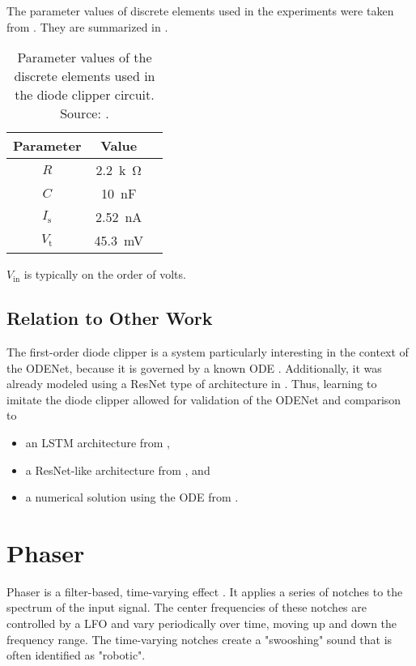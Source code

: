 The parameter values of discrete elements used in the experiments were taken from \cite{Yeh2008}. They are summarized in .

\begin{table}
  \centering
  \caption{Parameter values of the discrete elements used in the diode clipper circuit. Source: \cite{Yeh2008}.}
  \begin{tabular}{|c|c|c|}
    \hline
    Parameter & Value \\
    \hline
    $R$ & \SI{2.2}{k\ohm} \\
    $C$ & \SI{10}{nF} \\
    $I_\text{s}$ & \SI{2.52}{nA} \\
    $V_\text{t}$ & \SI{45.3}{mV} \\
    \hline
  \end{tabular}
  \label{tab:diode_clipper_element_parameters}
\end{table}

$V_\text{in}$ is typically on the order of volts.

\subsection{Relation to Other Work}

The first-order diode clipper is a system particularly interesting in the context of the ODENet, because it is governed by a known \ac{ODE} \cite{Yeh2007,Yeh2008}. Additionally, it was already modeled using a \ac{ResNet} type of architecture in \cite{Parker2019}. Thus, learning to imitate the diode clipper allowed for validation of the ODENet and comparison to 
\begin{itemize}
    \item an \ac{LSTM} architecture from \cite{Wrightetal2020},
    \item a \ac{ResNet}-like architecture from \cite{Parker2019}, and
    \item a numerical solution using the \ac{ODE} from \cite{Yeh2007,Yeh2008}.
\end{itemize}


\section{Phaser}
\label{chap:phaser}
Phaser is a filter-based, time-varying effect \cite{Zoelzer2011}. It applies a series of notches to the spectrum of the input signal. The center frequencies of these notches are controlled by a \ac{LFO} and vary periodically over time, moving up and down the frequency range. The time-varying notches create a "swooshing" sound that is often identified as "robotic".

